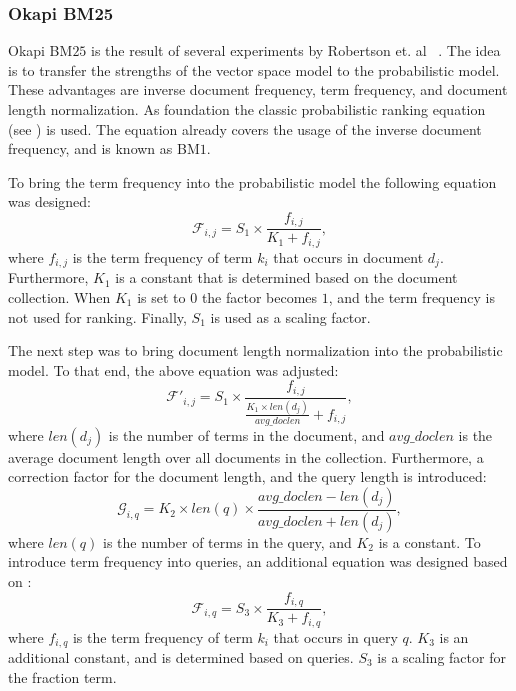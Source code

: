 \subsubsection{Okapi BM25}
\label{sec:okapi_bm25}

Okapi BM$25$ is the result of several experiments by Robertson et. al ~\cite{RobertsonWHGL92, RobertsonWJHG93, RobertsonWJHG94}. The idea is to transfer the strengths of the vector space model to the probabilistic model. These advantages are inverse document frequency, term frequency, and document length normalization. As foundation the classic probabilistic ranking equation (see ) is used. The equation already covers the usage of the inverse document frequency, and is known as BM$1$.

To bring the term frequency into the probabilistic model the following equation was designed:
\begin{equation}
  \label{bm25_term_frequency_factor}
  \mathcal{F}_{i, j} = S_1 \times \frac{f_{i,j}}{K_1 + f_{i, j}},
\end{equation}
where $f_{i, j}$ is the term frequency of term $k_i$ that occurs in document $d_j$. Furthermore, $K_1$ is a constant that is determined based on the document collection. When $K_1$ is set to $0$ the factor becomes $1$, and the term frequency is not used for ranking. Finally, $S_1$ is used as a scaling factor.   

The next step was to bring document length normalization into the probabilistic model. To that end, the above equation was adjusted:
\begin{equation}
  \label{bm25_term_frequency_factor_extension}
  \mathcal{F}'_{i, j} = S_1 \times \frac{f_{i,j}}{\frac{K_1 \times len(d_j)}{avg\_doclen} + f_{i, j}},
\end{equation} 
where $len(d_j)$ is the number of terms in the document, and $avg\_doclen$ is the average document length over all documents in the collection. Furthermore, a correction factor for the document length, and the query length is introduced:
\begin{equation}
  \mathcal{G}_{i, q} = K_2 \times len(q) \times \frac{avg\_doclen - len(d_j)}{avg\_doclen + len(d_j)},
\end{equation}
where $len(q)$ is the number of terms in the query, and $K_2$ is a constant. To introduce term frequency into queries, an additional equation was designed based on :
\begin{equation}
  \mathcal{F}_{i, q} = S_3 \times \frac{f_{i,q}}{K_3 + f_{i, q}},
\end{equation}
where $f_{i,q}$ is the term frequency of term $k_i$ that occurs in query $q$. $K_3$ is an additional constant, and is determined based on queries. $S_3$ is a scaling factor for the fraction term.

